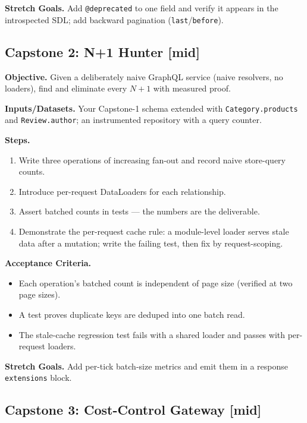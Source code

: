 \textbf{Stretch Goals.} Add \texttt{@deprecated} to one field and verify
it appears in the introspected SDL; add backward pagination
(\texttt{last}/\texttt{before}).

\subsection{Capstone 2: N+1 Hunter [mid]}

\textbf{Objective.} Given a deliberately naive GraphQL service (naive
resolvers, no loaders), find and eliminate every $N{+}1$ with measured
proof.

\textbf{Inputs/Datasets.} Your Capstone-1 schema extended with
\texttt{Category.products} and \texttt{Review.author}; an instrumented
repository with a query counter.

\textbf{Steps.}
\begin{enumerate}
  \item Write three operations of increasing fan-out and record naive
        store-query counts.
  \item Introduce per-request DataLoaders for each relationship.
  \item Assert batched counts in tests --- the numbers are the
        deliverable.
  \item Demonstrate the per-request cache rule: a module-level loader
        serves stale data after a mutation; write the failing test, then
        fix by request-scoping.
\end{enumerate}

\textbf{Acceptance Criteria.}
\begin{itemize}
  \item[$\square$] Each operation's batched count is independent of page
        size (verified at two page sizes).
  \item[$\square$] A test proves duplicate keys are deduped into one
        batch read.
  \item[$\square$] The stale-cache regression test fails with a shared
        loader and passes with per-request loaders.
\end{itemize}

\textbf{Stretch Goals.} Add per-tick batch-size metrics and emit them in
a response \texttt{extensions} block.

\subsection{Capstone 3: Cost-Control Gateway [mid]}

